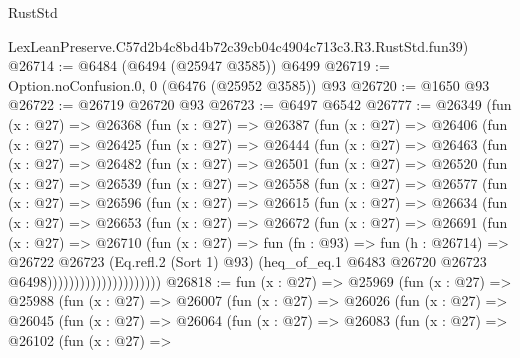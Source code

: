 \begin{lexlean}{RustStd}
\begin{coremodule}
    LexLeanPreserve.C57d2b4c8bd4b72c39cb04c4904c713c3.R3.RustStd.fun39)
@26714 := @6484 (@6494 (@25947 @3585)) @6499
@26719 := Option.noConfusion.{0, 0} (@6476 (@25952 @3585)) @93
@26720 := @1650 @93
@26722 := @26719 @26720 @93
@26723 := @6497 @6542
@26777 := @26349
    (fun (x : @27) =>
    @26368
      (fun (x : @27) =>
      @26387
        (fun (x : @27) =>
        @26406
          (fun (x : @27) =>
          @26425
            (fun (x : @27) =>
            @26444
              (fun (x : @27) =>
              @26463
                (fun (x : @27) =>
                @26482
                  (fun (x : @27) =>
                  @26501
                    (fun (x : @27) =>
                    @26520
                      (fun (x : @27) =>
                      @26539
                        (fun (x : @27) =>
                        @26558
                          (fun (x : @27) =>
                          @26577
                            (fun (x : @27) =>
                            @26596
                              (fun (x : @27) =>
                              @26615
                                (fun (x : @27) =>
                                @26634
                                  (fun (x : @27) =>
                                  @26653
                                    (fun (x : @27) =>
                                    @26672
                                      (fun (x : @27) =>
                                      @26691
                                        (fun (x : @27) =>
                                        @26710
                                          (fun (x : @27) =>
                                          fun (fn : @93) =>
                                          fun (h : @26714) =>
                                          @26722
                                            @26723
                                            (Eq.refl.{2} (Sort 1) @93)
                                            (heq_of_eq.{1}
                                              @6483
                                              @26720
                                              @26723
                                              @6498)))))))))))))))))))))
@26818 := fun (x : @27) =>
  @25969
    (fun (x : @27) =>
    @25988
      (fun (x : @27) =>
      @26007
        (fun (x : @27) =>
        @26026
          (fun (x : @27) =>
          @26045
            (fun (x : @27) =>
            @26064
              (fun (x : @27) =>
              @26083
                (fun (x : @27) =>
                @26102
                  (fun (x : @27) =>

\end{coremodule}
\end{lexlean}
